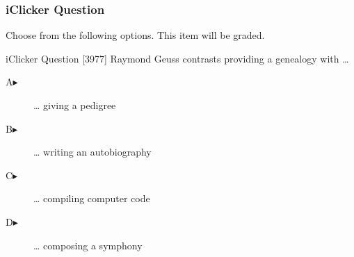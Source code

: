 \begin{frame}
  \frametitle{iClicker Question}
Choose from the following options. This item will be graded.
\begin{block}{iClicker Question}
[3977] Raymond Geuss contrasts providing a genealogy with {\ldots}
\end{block}
\begin{description}
\item[A\hspace{.2in}$\blacktriangleright$] {\ldots} giving a pedigree
\item[B\hspace{.2in}$\blacktriangleright$] {\ldots} writing an autobiography
\item[C\hspace{.2in}$\blacktriangleright$] {\ldots} compiling computer code
\item[D\hspace{.2in}$\blacktriangleright$] {\ldots} composing a symphony
\end{description}
\end{frame}
